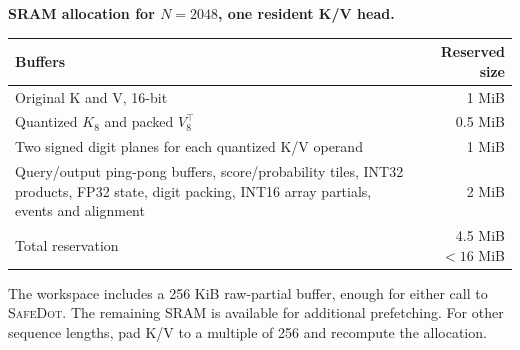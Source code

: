 \documentclass[11pt]{article}
\newcommand{\SafeDot}{\textsc{SafeDot}}
\begin{document}
\textbf{SRAM allocation for $N=2048$, one resident K/V head.}
\begin{tabularx}{\linewidth}{@{}Xr@{}}
\toprule
Buffers & Reserved size \\
\midrule
Original K and V, 16-bit & 1 MiB \\
Quantized $K_8$ and packed $V_8^\top$ & 0.5 MiB \\
Two signed digit planes for each quantized K/V operand & 1 MiB \\
Query/output ping-pong buffers, score/probability tiles, INT32 products,
FP32 state, digit packing, INT16 array partials, events and alignment & 2 MiB \\
\midrule
Total reservation & 4.5 MiB $<16$ MiB \\
\bottomrule
\end{tabularx}
The workspace includes a 256 KiB raw-partial buffer, enough for either call to
\SafeDot. The remaining SRAM is available for additional prefetching. For other
sequence lengths, pad K/V to a multiple of 256 and recompute the allocation.
\end{document}
